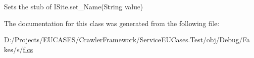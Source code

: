Sets the stub of I\-Site.\-set\-\_\-\-Name(\-String value)



The documentation for this class was generated from the following file\-:\begin{DoxyCompactItemize}
\item 
D\-:/\-Projects/\-E\-U\-C\-A\-S\-E\-S/\-Crawler\-Framework/\-Service\-E\-U\-Cases.\-Test/obj/\-Debug/\-Fakes/s/\hyperlink{s_2f_8cs}{f.\-cs}\end{DoxyCompactItemize}
